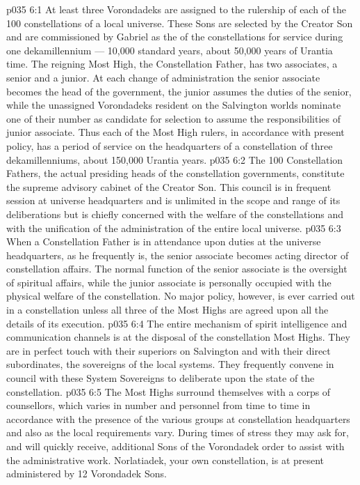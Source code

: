 \vs p035 6:1 At least three Vorondadeks are assigned to the rulership of each of the 100 constellations of a local universe. These Sons are selected by the Creator Son and are commissioned by Gabriel as the  of the constellations for service during one dekamillennium --- 10,000 standard years, about 50,000 years of Urantia time. The reigning Most High, the Constellation Father, has two associates, a senior and a junior. At each change of administration the senior associate becomes the head of the government, the junior assumes the duties of the senior, while the unassigned Vorondadeks resident on the Salvington worlds nominate one of their number as candidate for selection to assume the responsibilities of junior associate. Thus each of the Most High rulers, in accordance with present policy, has a period of service on the headquarters of a constellation of three dekamillenniums, about 150,000 Urantia years.
\vs p035 6:2 The 100 Constellation Fathers, the actual presiding heads of the constellation governments, constitute the supreme advisory cabinet of the Creator Son. This council is in frequent session at universe headquarters and is unlimited in the scope and range of its deliberations but is chiefly concerned with the welfare of the constellations and with the unification of the administration of the entire local universe.
\vs p035 6:3 When a Constellation Father is in attendance upon duties at the universe headquarters, as he frequently is, the senior associate becomes acting director of constellation affairs. The normal function of the senior associate is the oversight of spiritual affairs, while the junior associate is personally occupied with the physical welfare of the constellation. No major policy, however, is ever carried out in a constellation unless all three of the Most Highs are agreed upon all the details of its execution.
\vs p035 6:4 The entire mechanism of spirit intelligence and communication channels is at the disposal of the constellation Most Highs. They are in perfect touch with their superiors on Salvington and with their direct subordinates, the sovereigns of the local systems. They frequently convene in council with these System Sovereigns to deliberate upon the state of the constellation.
\vs p035 6:5 The Most Highs surround themselves with a corps of counsellors, which varies in number and personnel from time to time in accordance with the presence of the various groups at constellation headquarters and also as the local requirements vary. During times of stress they may ask for, and will quickly receive, additional Sons of the Vorondadek order to assist with the administrative work. Norlatiadek, your own constellation, is at present administered by 12 Vorondadek Sons.
